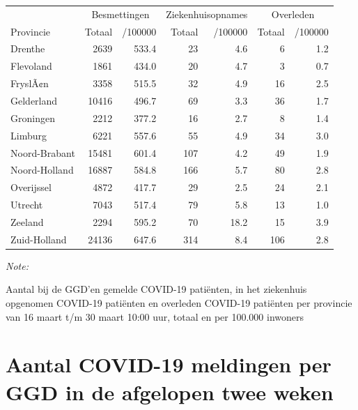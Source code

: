 \documentclass[
  english,
  man,floatsintext]{apa6}
\begin{document}
\begin{table}
\centering
\begin{threeparttable}
\begin{tabular}{lrrrrrr}
\toprule
\multicolumn{1}{c}{ } & \multicolumn{2}{c}{Besmettingen} & \multicolumn{2}{c}{Ziekenhuisopnames} & \multicolumn{2}{c}{Overleden} \\
\cmidrule(l{3pt}r{3pt}){2-3} \cmidrule(l{3pt}r{3pt}){4-5} \cmidrule(l{3pt}r{3pt}){6-7}
Provincie & Totaal & /100000 & Totaal & /100000 & Totaal & /100000\\
\midrule
Drenthe & 2639 & 533.4 & 23 & 4.6 & 6 & 1.2\\
Flevoland & 1861 & 434.0 & 20 & 4.7 & 3 & 0.7\\
FryslÃ¢n & 3358 & 515.5 & 32 & 4.9 & 16 & 2.5\\
Gelderland & 10416 & 496.7 & 69 & 3.3 & 36 & 1.7\\
Groningen & 2212 & 377.2 & 16 & 2.7 & 8 & 1.4\\
Limburg & 6221 & 557.6 & 55 & 4.9 & 34 & 3.0\\
Noord-Brabant & 15481 & 601.4 & 107 & 4.2 & 49 & 1.9\\
Noord-Holland & 16887 & 584.8 & 166 & 5.7 & 80 & 2.8\\
Overijssel & 4872 & 417.7 & 29 & 2.5 & 24 & 2.1\\
Utrecht & 7043 & 517.4 & 79 & 5.8 & 13 & 1.0\\
Zeeland & 2294 & 595.2 & 70 & 18.2 & 15 & 3.9\\
Zuid-Holland & 24136 & 647.6 & 314 & 8.4 & 106 & 2.8\\
\bottomrule
\end{tabular}
\begin{tablenotes}
\item \textit{Note: } 
\item Aantal bij de GGD’en gemelde COVID-19 patiënten, in het ziekenhuis opgenomen COVID-19 patiënten en overleden COVID-19 patiënten per provincie van 16 maart t/m 30 maart 10:00 uur, totaal en per 100.000 inwoners
\end{tablenotes}
\end{threeparttable}
\end{table}

\newpage

\hypertarget{aantal-covid-19-meldingen-per-ggd-in-de-afgelopen-twee-weken}{%
\section{Aantal COVID-19 meldingen per GGD in de afgelopen twee weken}\label{aantal-covid-19-meldingen-per-ggd-in-de-afgelopen-twee-weken}}
\end{document}
